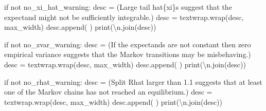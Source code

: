 \documentclass[
  letterpaper,
  DIV=11,
  numbers=noendperiod]{scrartcl}
\newenvironment{Shaded}{\begin{snugshade}}{\end{snugshade}}
\newcommand{\BuiltInTok}[1]{\textcolor[rgb]{0.00,0.23,0.31}{#1}}
\newcommand{\CharTok}[1]{\textcolor[rgb]{0.13,0.47,0.30}{#1}}
\newcommand{\ControlFlowTok}[1]{\textcolor[rgb]{0.00,0.23,0.31}{#1}}
\newcommand{\KeywordTok}[1]{\textcolor[rgb]{0.00,0.23,0.31}{#1}}
\newcommand{\NormalTok}[1]{\textcolor[rgb]{0.00,0.23,0.31}{#1}}
\newcommand{\OperatorTok}[1]{\textcolor[rgb]{0.37,0.37,0.37}{#1}}
\newcommand{\SpecialCharTok}[1]{\textcolor[rgb]{0.37,0.37,0.37}{#1}}
\newcommand{\StringTok}[1]{\textcolor[rgb]{0.13,0.47,0.30}{#1}}
\begin{document}
\begin{Shaded}
\begin{Highlighting}[]
  \ControlFlowTok{if} \KeywordTok{not}\NormalTok{ no\_xi\_hat\_warning:}
\NormalTok{    desc }\OperatorTok{=}\NormalTok{ (}\StringTok{\textquotesingle{}Large tail hat}\SpecialCharTok{\{xi\}}\StringTok{s suggest that the expectand \textquotesingle{}}
            \StringTok{\textquotesingle{}might not be sufficiently integrable.\textquotesingle{}}\NormalTok{)}
\NormalTok{    desc }\OperatorTok{=}\NormalTok{ textwrap.wrap(desc, max\_width)}
\NormalTok{    desc.append(}\StringTok{\textquotesingle{} \textquotesingle{}}\NormalTok{)}
    \BuiltInTok{print}\NormalTok{(}\StringTok{\textquotesingle{}}\CharTok{\textbackslash{}n}\StringTok{\textquotesingle{}}\NormalTok{.join(desc))}
  
  \ControlFlowTok{if} \KeywordTok{not}\NormalTok{ no\_zvar\_warning:}
\NormalTok{    desc }\OperatorTok{=}\NormalTok{ (}\StringTok{\textquotesingle{}If the expectands are not constant then zero empirical \textquotesingle{}}
            \StringTok{\textquotesingle{}variance suggests that the Markov transitions may be \textquotesingle{}}
            \StringTok{\textquotesingle{}misbehaving.\textquotesingle{}}\NormalTok{)}
\NormalTok{    desc }\OperatorTok{=}\NormalTok{ textwrap.wrap(desc, max\_width)}
\NormalTok{    desc.append(}\StringTok{\textquotesingle{} \textquotesingle{}}\NormalTok{)}
    \BuiltInTok{print}\NormalTok{(}\StringTok{\textquotesingle{}}\CharTok{\textbackslash{}n}\StringTok{\textquotesingle{}}\NormalTok{.join(desc))}
  
  \ControlFlowTok{if} \KeywordTok{not}\NormalTok{ no\_rhat\_warning:}
\NormalTok{    desc }\OperatorTok{=}\NormalTok{ (}\StringTok{\textquotesingle{}Split Rhat larger than 1.1 suggests that at least one of \textquotesingle{}}
            \StringTok{\textquotesingle{}the Markov chains has not reached an equilibrium.\textquotesingle{}}\NormalTok{)}
\NormalTok{    desc }\OperatorTok{=}\NormalTok{ textwrap.wrap(desc, max\_width)}
\NormalTok{    desc.append(}\StringTok{\textquotesingle{} \textquotesingle{}}\NormalTok{)}
    \BuiltInTok{print}\NormalTok{(}\StringTok{\textquotesingle{}}\CharTok{\textbackslash{}n}\StringTok{\textquotesingle{}}\NormalTok{.join(desc))}
  

\end{Highlighting}
\end{Shaded}
\end{document}
